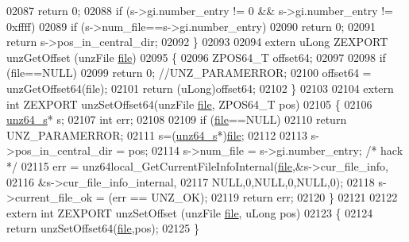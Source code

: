 \begin{DoxyCode}
02087       \textcolor{keywordflow}{return} 0;
02088     \textcolor{keywordflow}{if} (s->gi.number\_entry != 0 && s->gi.number\_entry != 0xffff)
02089       \textcolor{keywordflow}{if} (s->num\_file==s->gi.number\_entry)
02090          \textcolor{keywordflow}{return} 0;
02091     \textcolor{keywordflow}{return} s->pos\_in\_central\_dir;
02092 \}
02093 
02094 \textcolor{keyword}{extern} uLong ZEXPORT unzGetOffset (unzFile \hyperlink{structfile}{file})
02095 \{
02096     ZPOS64\_T offset64;
02097 
02098     \textcolor{keywordflow}{if} (file==NULL)
02099           \textcolor{keywordflow}{return} 0; \textcolor{comment}{//UNZ\_PARAMERROR;}
02100     offset64 = unzGetOffset64(file);
02101     \textcolor{keywordflow}{return} (uLong)offset64;
02102 \}
02103 
02104 \textcolor{keyword}{extern} \textcolor{keywordtype}{int} ZEXPORT unzSetOffset64(unzFile \hyperlink{structfile}{file}, ZPOS64\_T pos)
02105 \{
02106     \hyperlink{structunz64__s}{unz64\_s}* s;
02107     \textcolor{keywordtype}{int} err;
02108 
02109     \textcolor{keywordflow}{if} (\hyperlink{structfile}{file}==NULL)
02110         \textcolor{keywordflow}{return} UNZ\_PARAMERROR;
02111     s=(\hyperlink{structunz64__s}{unz64\_s}*)\hyperlink{structfile}{file};
02112 
02113     s->pos\_in\_central\_dir = pos;
02114     s->num\_file = s->gi.number\_entry;      \textcolor{comment}{/* hack */}
02115     err = unz64local\_GetCurrentFileInfoInternal(\hyperlink{structfile}{file},&s->cur\_file\_info,
02116                                               &s->cur\_file\_info\_internal,
02117                                               NULL,0,NULL,0,NULL,0);
02118     s->current\_file\_ok = (err == UNZ\_OK);
02119     \textcolor{keywordflow}{return} err;
02120 \}
02121 
02122 \textcolor{keyword}{extern} \textcolor{keywordtype}{int} ZEXPORT unzSetOffset (unzFile \hyperlink{structfile}{file}, uLong pos)
02123 \{
02124     \textcolor{keywordflow}{return} unzSetOffset64(\hyperlink{structfile}{file},pos);
02125 \}
\end{DoxyCode}
